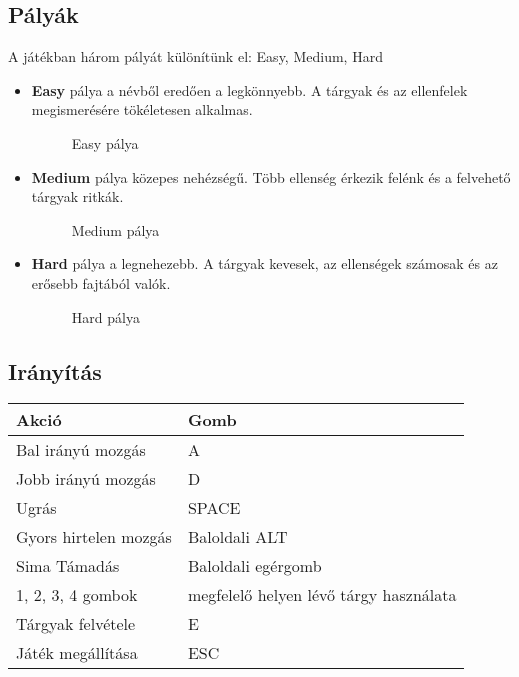 \begin{enumerate}
\end{enumerate}

\subsection{Pályák}
A játékban három pályát különítünk el: Easy, Medium, Hard

\begin{itemize}
	\item \textbf{Easy} pálya a névből eredően a legkönnyebb. A tárgyak és az ellenfelek megismerésére tökéletesen alkalmas.
	\begin{figure}[H]
		\noindent{}
		\caption{Easy pálya}
	\end{figure}
		\cleardoublepage
		\item \textbf{Medium} pálya közepes nehézségű. Több ellenség érkezik felénk és a felvehető tárgyak ritkák.
	\begin{figure}[H]
		\noindent{}
		\caption{Medium pálya}
	\end{figure}
	
		\item \textbf{Hard} pálya a legnehezebb. A tárgyak kevesek, az ellenségek számosak és az erősebb fajtából valók.
	\begin{figure}[H]
		\noindent{}
		\caption{Hard pálya}
	\end{figure}
\end{itemize}

\subsection{Irányítás}
\begin{table}[H]
	\centering
	\begin{tabular}{ | m{} | m{} | }
		\hline
		\textbf{Akció} & \textbf{Gomb} \\
		\hline \hline
		Bal irányú mozgás & A \\ \hline
		Jobb irányú mozgás & D \\ \hline
		Ugrás & SPACE \\ \hline
		Gyors hirtelen mozgás & Baloldali ALT \\ \hline
		Sima Támadás & Baloldali egérgomb \\ \hline
		1, 2, 3, 4 gombok & megfelelő helyen lévő tárgy használata \\ \hline
		Tárgyak felvétele & E \\ \hline
		Játék megállítása & ESC \\ \hline
	\end{tabular}
	\label{instruc}
\end{table}


